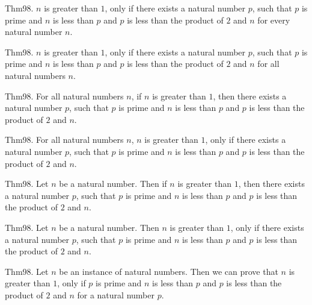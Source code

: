 \documentclass{article}
\begin{document}
Thm98. $n$ is greater than $1$, only if there exists a natural number $p$, such that $p$ is prime and $n$ is less than $p$ and $p$ is less than the product of $2$ and $n$ for every natural number $n$.

Thm98. $n$ is greater than $1$, only if there exists a natural number $p$, such that $p$ is prime and $n$ is less than $p$ and $p$ is less than the product of $2$ and $n$ for all natural numbers $n$.

Thm98. For all natural numbers $n$, if $n$ is greater than $1$, then there exists a natural number $p$, such that $p$ is prime and $n$ is less than $p$ and $p$ is less than the product of $2$ and $n$.

Thm98. For all natural numbers $n$, $n$ is greater than $1$, only if there exists a natural number $p$, such that $p$ is prime and $n$ is less than $p$ and $p$ is less than the product of $2$ and $n$.

Thm98. Let $n$ be a natural number. Then if $n$ is greater than $1$, then there exists a natural number $p$, such that $p$ is prime and $n$ is less than $p$ and $p$ is less than the product of $2$ and $n$.

Thm98. Let $n$ be a natural number. Then $n$ is greater than $1$, only if there exists a natural number $p$, such that $p$ is prime and $n$ is less than $p$ and $p$ is less than the product of $2$ and $n$.

Thm98. Let $n$ be an instance of natural numbers. Then we can prove that $n$ is greater than $1$, only if $p$ is prime and $n$ is less than $p$ and $p$ is less than the product of $2$ and $n$ for a natural number $p$.
\end{document}
